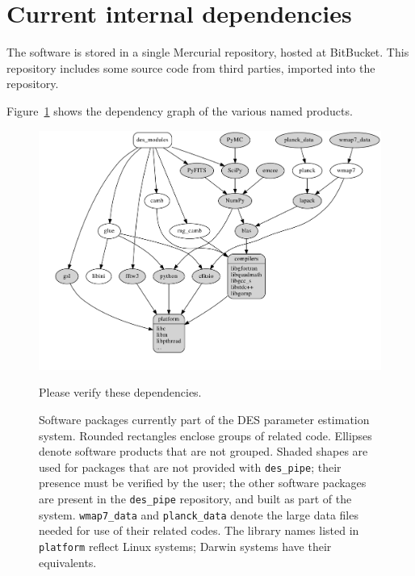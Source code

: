 \documentclass[draftmode,draftwater]{memarticle}
\newcommand{\despipe}{\name{des-pipe}\xspace}
\begin{document}
\section{Current internal dependencies}

The \despipe software is stored in a single
Mercurial\cite{mercurial} repository, hosted at
BitBucket\cite{bitbucket}. This repository includes some source code
from third parties, imported into the repository.

Figure~\ref{fig:astropackages} shows the dependency graph of the various
named products.

\begin{figure}
  \centering
    \includegraphics[height=\textheight,width=\textwidth,keepaspectratio=true]{astro_packages}
    \caption{Software packages currently part of the DES parameter
    estimation system. Rounded rectangles enclose groups of related
    code. Ellipses denote software products that are not grouped.
    Shaded shapes are used for packages that are not provided with
    \texttt{des\_pipe}; their presence must be verified by the user;
    the other software packages are present in the \texttt{des\_pipe}
    repository, and built as part of the system. \texttt{wmap7\_data}
    and \texttt{planck\_data} denote the large data files needed for
    use of their related codes. The library names listed in
    \texttt{platform} reflect Linux systems; Darwin systems have their
    equivalents.} \label{fig:astropackages}
    \begin{fixme}
    Please verify these dependencies.
    \end{fixme}
\end{figure}
\end{document}
